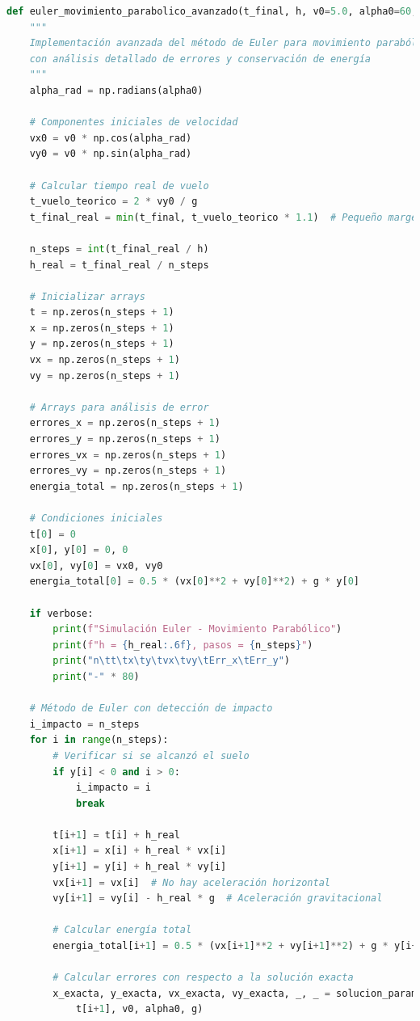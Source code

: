 \documentclass{article}
\begin{document}
	\begin{lstlisting}[language=Python, caption={Método de Euler para movimiento parabólico con análisis de error}]
def euler_movimiento_parabolico_avanzado(t_final, h, v0=5.0, alpha0=60, g=9.81, verbose=False):
    """
    Implementación avanzada del método de Euler para movimiento parabólico
    con análisis detallado de errores y conservación de energía
    """
    alpha_rad = np.radians(alpha0)
    
    # Componentes iniciales de velocidad
    vx0 = v0 * np.cos(alpha_rad)
    vy0 = v0 * np.sin(alpha_rad)
    
    # Calcular tiempo real de vuelo
    t_vuelo_teorico = 2 * vy0 / g
    t_final_real = min(t_final, t_vuelo_teorico * 1.1)  # Pequeño margen
    
    n_steps = int(t_final_real / h)
    h_real = t_final_real / n_steps
    
    # Inicializar arrays
    t = np.zeros(n_steps + 1)
    x = np.zeros(n_steps + 1)
    y = np.zeros(n_steps + 1)
    vx = np.zeros(n_steps + 1)
    vy = np.zeros(n_steps + 1)
    
    # Arrays para análisis de error
    errores_x = np.zeros(n_steps + 1)
    errores_y = np.zeros(n_steps + 1)
    errores_vx = np.zeros(n_steps + 1)
    errores_vy = np.zeros(n_steps + 1)
    energia_total = np.zeros(n_steps + 1)
    
    # Condiciones iniciales
    t[0] = 0
    x[0], y[0] = 0, 0
    vx[0], vy[0] = vx0, vy0
    energia_total[0] = 0.5 * (vx[0]**2 + vy[0]**2) + g * y[0]
    
    if verbose:
        print(f"Simulación Euler - Movimiento Parabólico")
        print(f"h = {h_real:.6f}, pasos = {n_steps}")
        print("n\tt\tx\ty\tvx\tvy\tErr_x\tErr_y")
        print("-" * 80)
    
    # Método de Euler con detección de impacto
    i_impacto = n_steps
    for i in range(n_steps):
        # Verificar si se alcanzó el suelo
        if y[i] < 0 and i > 0:
            i_impacto = i
            break
            
        t[i+1] = t[i] + h_real
        x[i+1] = x[i] + h_real * vx[i]
        y[i+1] = y[i] + h_real * vy[i]
        vx[i+1] = vx[i]  # No hay aceleración horizontal
        vy[i+1] = vy[i] - h_real * g  # Aceleración gravitacional
        
        # Calcular energía total
        energia_total[i+1] = 0.5 * (vx[i+1]**2 + vy[i+1]**2) + g * y[i+1]
        
        # Calcular errores con respecto a la solución exacta
        x_exacta, y_exacta, vx_exacta, vy_exacta, _, _ = solucion_parametrica_exacta(
            t[i+1], v0, alpha0, g)
        

\end{lstlisting}
\end{document}

